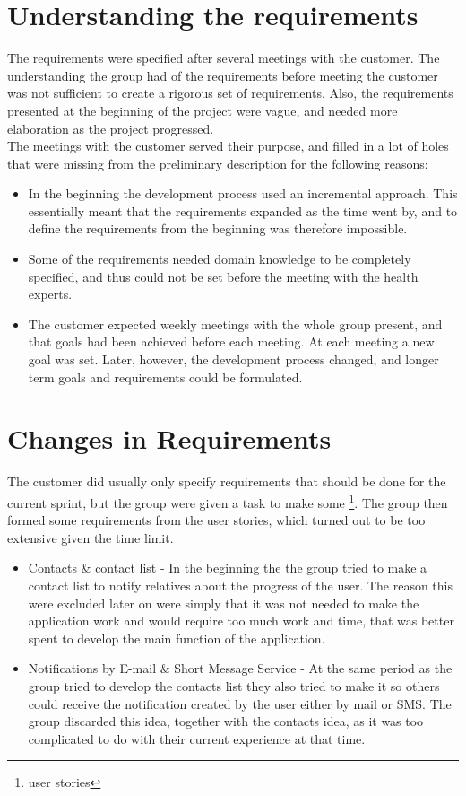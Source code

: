 \section{Understanding the requirements}

The requirements were specified after several meetings with the customer. The understanding the group had of the requirements before meeting the customer was not sufficient to create a rigorous set of requirements. Also, the requirements presented at the beginning of the project were vague, and needed more elaboration as the project progressed. \\

The meetings with the customer served their purpose, and filled in a lot of holes that were missing from the preliminary description for the following reasons:
\begin{itemize}
\item In the beginning the development process used an incremental approach. This essentially meant that the requirements expanded as the time went by, and to define the requirements from the beginning was therefore impossible.
\item Some of the requirements needed domain knowledge to be completely specified, and thus could not be set before the meeting with the health experts.
\item The customer expected weekly meetings with the whole group present, and that goals had been achieved before each meeting. At each meeting a new goal was set. Later, however, the development process changed, and longer term goals and requirements could be formulated. 
\end{itemize}

\section{Changes in Requirements}

The customer did usually only specify requirements that should be done for the current sprint, but the group were given a task to make some \footnote{user stories}. The group then formed some requirements from the user stories, which turned out to be too extensive given the time limit.

\begin{itemize} 
\item Contacts \& contact list - In the beginning the the group tried to make a contact list to notify relatives about the progress of the user. The reason this were excluded later on were simply that it was not needed to make the application work and would require too much work and time, that was better spent to develop the main function of the application. 
\item Notifications by E-mail \& Short Message Service - At the same period as the group tried to develop the contacts list they also tried to make it so others could receive the notification created by the user either by mail or SMS. The group discarded this idea, together with the contacts idea, as it was too complicated to do with their current experience at that time.
\end{itemize} 
